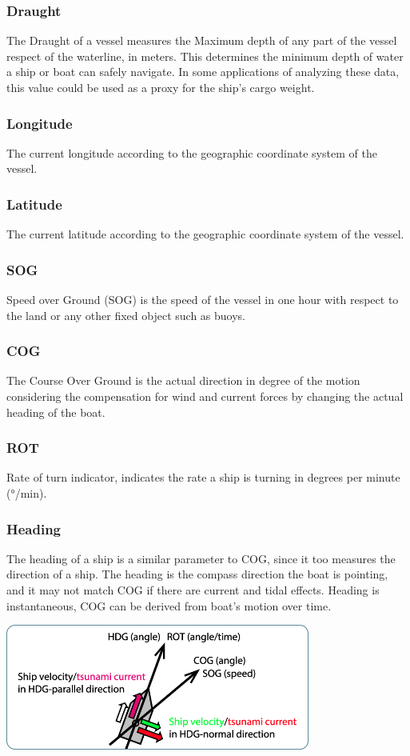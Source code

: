 \subsubsection{Draught}
    The Draught of a vessel measures the Maximum depth of any part of the vessel respect of the waterline, in meters. This determines the minimum depth of water a ship or boat can safely navigate. In some applications of analyzing these data, this value could be used as a proxy for the ship's cargo weight.
\subsubsection{Longitude}
    The current longitude according to the geographic coordinate system of the vessel.
\subsubsection{Latitude}
    The current latitude according to the geographic coordinate system of the vessel.
\subsubsection{SOG}
    Speed over Ground (SOG) is the speed of the vessel in one hour with respect to the land or any other fixed object such as buoys.
\subsubsection{COG}
    The Course Over Ground is the actual direction in degree of the motion considering the compensation for wind and current forces by changing the actual heading of the boat.
\subsubsection{ROT}
    Rate of turn indicator, indicates the rate a ship is turning in degrees per minute (°/min).
\subsubsection{Heading}
    The heading of a ship is a similar parameter to COG, since it too measures the direction of a ship. The heading is the compass direction the boat is pointing, and it may not match COG if there are current and tidal effects. Heading is instantaneous, COG can be derived from boat's motion over time.
    \\
    \begin{center}
    \includegraphics[width=10cm]{Images/1/cog-sog.png}
    \end{center}
    
